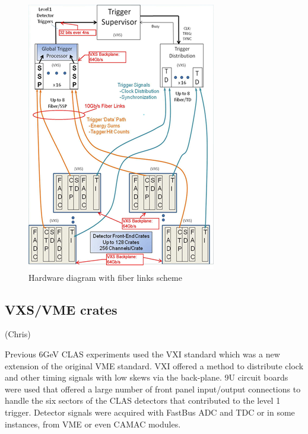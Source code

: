 \begin{figure}[hbt]
	\centering
	\includegraphics[width=1.0\columnwidth,keepaspectratio]{img/hardware_diagram.png}
	\caption{Hardware diagram with fiber links scheme}
	\label{fig:hardwarediagram}
\end{figure}




\subsection{VXS/VME crates} (Chris)

Previous 6GeV CLAS experiments used the VXI standard which was a new extension of the original VME standard. VXI offered a method to distribute clock and other timing signals with low skews via the back-plane. 9U circuit boards were used that offered a large number of front panel input/output connections to handle the six sectors of the CLAS detectors that contributed to the level 1 trigger. Detector signals were acquired with FastBus ADC and TDC or in some instances, from VME or even CAMAC modules. 

